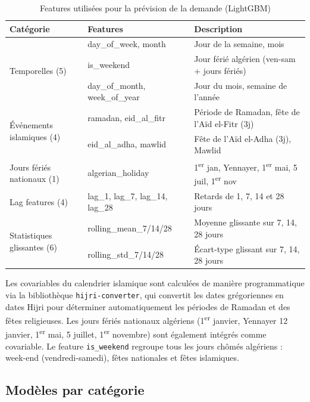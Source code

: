 \documentclass[12pt,a4paper]{report}
\begin{document}
\begin{table}[H]
\centering
\caption{Features utilis\'{e}es pour la pr\'{e}vision de la demande (LightGBM)}
\label{tab:forecast_features}
\begin{tabularx}{\textwidth}{l l X}
\toprule
\textbf{Cat\'{e}gorie} & \textbf{Features} & \textbf{Description} \\
\midrule
\multirow{3}{*}{Temporelles (5)} & day\_of\_week, month & Jour de la semaine, mois \\
 & is\_weekend & Jour f\'{e}ri\'{e} alg\'{e}rien (ven-sam + jours f\'{e}ri\'{e}s) \\
 & day\_of\_month, week\_of\_year & Jour du mois, semaine de l'ann\'{e}e \\
\midrule
\multirow{2}{*}{\'{E}v\'{e}nements islamiques (4)} & ramadan, eid\_al\_fitr & P\'{e}riode de Ramadan, f\^{e}te de l'A\"{i}d el-Fitr (3j) \\
 & eid\_al\_adha, mawlid & F\^{e}te de l'A\"{i}d el-Adha (3j), Mawlid \\
\midrule
Jours f\'{e}ri\'{e}s nationaux (1) & algerian\_holiday & 1\textsuperscript{er} jan, Yennayer,  1\textsuperscript{er} mai, 5 juil, 1\textsuperscript{er} nov \\
\midrule
Lag features (4) & lag\_1, lag\_7, lag\_14, lag\_28 & Retards de 1, 7, 14 et 28 jours \\
\midrule
\multirow{2}{*}{Statistiques glissantes (6)} & rolling\_mean\_7/14/28 & Moyenne glissante sur 7, 14, 28 jours \\
 & rolling\_std\_7/14/28 & \'{E}cart-type glissant sur 7, 14, 28 jours \\
\bottomrule
\end{tabularx}
\end{table}

Les covariables du calendrier islamique sont calcul\'{e}es de mani\`{e}re programmatique via la biblioth\`{e}que \texttt{hijri-converter}, qui convertit les dates gr\'{e}goriennes en dates Hijri pour d\'{e}terminer automatiquement les p\'{e}riodes de Ramadan et des f\^{e}tes religieuses. Les jours f\'{e}ri\'{e}s nationaux alg\'{e}riens (1\textsuperscript{er} janvier, Yennayer 12 janvier, 1\textsuperscript{er} mai, 5 juillet, 1\textsuperscript{er} novembre) sont \'{e}galement int\'{e}gr\'{e}s comme covariable. Le feature \texttt{is\_weekend} regroupe tous les jours ch\^{o}m\'{e}s alg\'{e}riens : week-end (vendredi-samedi), f\^{e}tes nationales et f\^{e}tes islamiques.

\subsection{Mod\`{e}les par cat\'{e}gorie}
\end{document}

